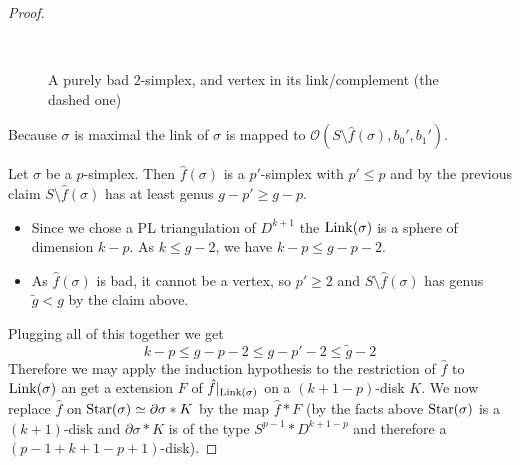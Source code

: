 \begin{proof}
\begin{figure}[htb]
\\[-1cm]
		\caption{A purely bad $2$-simplex, and vertex in its link/complement (the dashed one)}\label{fig:purely-bad}
	\end{figure}
	Because $\sigma$ is maximal the link of $\sigma$ is mapped to $\mathcal{O}(S\setminus \hat{f}(\sigma),b_0',b_1')$.
	
	Let $\sigma$ be a $p$-simplex.
	Then $\hat{f}(\sigma)$ is a $p'$-simplex with $p' \le p$ and by the previous claim $S \setminus \hat{f}(\sigma)$ has at least genus $g- p' \ge g- p$.
	\begin{itemize}[itemsep=0pt]
		\item Since we chose a PL triangulation of $D^{k+1}$ the $\operatorname{Link}(\sigma)$ is a sphere of dimension $k-p$.
		As $k \le g-2$, we have $k-p \le g -p -2$.
		\item As $\hat{f}(\sigma)$ is bad, it cannot be a vertex, so $p' \ge 2$ and $S \setminus \hat{f}(\sigma)$ has genus $\tilde{g} < g$ by the claim above.
	\end{itemize}
	Plugging all of this together we get
	\[
		k-p \le g- p -2 \le g- p' -2 \le \tilde{g} -2
	\]
	Therefore we may apply the induction hypothesis to the restriction of $\hat{f}$ to $\operatorname{Link}(\sigma)$ an get a extension $F$ of $\hat{f}|_{\operatorname{Link}(\sigma)}$ on a $(k+1-p)$-disk $K$.
	We now replace $\hat{f}$ on $\operatorname{Star}(\sigma) \simeq \partial \sigma * K$ by the map $\hat{f} * F$ (by the facts above $\operatorname{Star}(\sigma)$ is a $(k+1)$-disk and $\partial \sigma * K$ is of the type $S^{p-1} * D^{k+1-p}$ and therefore a $(p-1+k+1-p+1)$-disk).
	

\end{proof}
